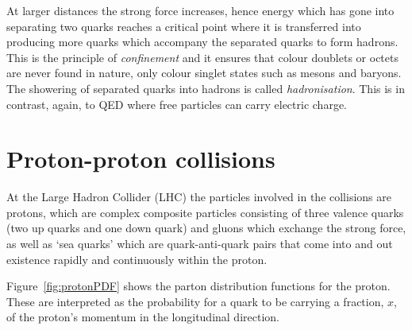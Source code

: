 
At larger distances the strong force increases, hence energy which has gone into separating two quarks reaches a critical point where it is transferred into producing more quarks which accompany the separated quarks to form hadrons. This is the principle of \emph{confinement} and it ensures that colour doublets or octets are never found in nature, only colour singlet states such as mesons and baryons. The showering of separated quarks into hadrons is called \emph{hadronisation}. This is in contrast, again, to QED where free particles can carry electric charge.


\section{Proton-proton collisions}
At the Large Hadron Collider (LHC) the particles involved in the collisions are protons, which are complex composite particles consisting of three valence quarks (two up quarks and one down quark) and gluons which exchange the strong force, as well as `sea quarks' which are quark-anti-quark pairs that come into and out existence rapidly and continuously within the proton.

Figure~\ref{fig:protonPDF} shows the parton distribution functions for the proton. These are interpreted as the probability for a quark to be carrying a fraction, $x$, of the proton's momentum in the longitudinal direction.


